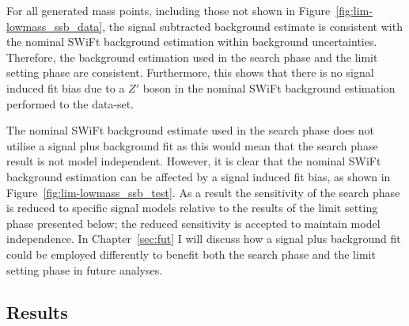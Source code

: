 For all generated mass points, including those not shown in Figure~\ref{fig:lim-lowmass_ssb_data},
the signal subtracted background estimate is consistent with the nominal SWiFt background estimation
within background uncertainties.
Therefore, the background estimation used in the search phase and the limit setting phase are consistent.
Furthermore, this shows that there is no signal induced fit bias due to a $Z'$ boson
in the nominal SWiFt background estimation performed to the \lm{} data-set.


The nominal SWiFt background estimate used in the search phase
does not utilise a signal plus background fit
as this would mean that the search phase result is not model independent.
However, it is clear that the nominal SWiFt background estimation can be affected by a signal induced fit bias,
as shown in Figure~\ref{fig:lim-lowmass_ssb_test}.
As a result the sensitivity of the search phase is reduced to specific signal models relative to the results of the limit setting phase presented below;
the reduced sensitivity is accepted to maintain model independence.
In Chapter~\ref{sec:fut} I will discuss how a signal plus background fit
could be employed differently to benefit both the search phase and the limit setting phase in future analyses.

\newpage
\subsection{Results}
\label{sec:lim-full_results}

